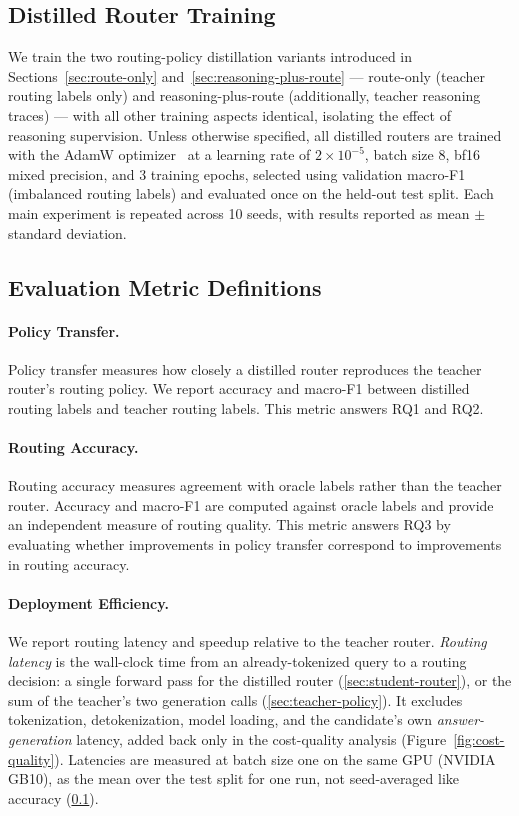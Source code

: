 \documentclass{article}
\begin{document}
\subsection{Distilled Router Training}
\label{sec:training-protocol}

We train the two routing-policy distillation variants introduced in Sections~\ref{sec:route-only} and~\ref{sec:reasoning-plus-route} — route-only (teacher routing labels only) and reasoning-plus-route (additionally, teacher reasoning traces) — with all other training aspects identical, isolating the effect of reasoning supervision. Unless otherwise specified, all distilled routers are trained with the AdamW optimizer~\citep{loshchilov2019decoupled} at a learning rate of $2 \times 10^{-5}$, batch size 8, bf16 mixed precision, and 3 training epochs, selected using validation macro-F1 (imbalanced routing labels) and evaluated once on the held-out test split. Each main experiment is repeated across 10 seeds, with results reported as mean $\pm$ standard deviation.

\subsection{Evaluation Metric Definitions}
\label{sec:eval-metrics-appendix}

\paragraph{Policy Transfer.}
\label{sec:routing-policy-transfer}
Policy transfer measures how closely a distilled router reproduces the teacher router's routing policy. We report accuracy and macro-F1 between distilled routing labels and teacher routing labels. This metric answers RQ1 and RQ2.

\paragraph{Routing Accuracy.}
\label{sec:routing-correctness}
Routing accuracy measures agreement with oracle labels rather than the teacher router. Accuracy and macro-F1 are computed against oracle labels and provide an independent measure of routing quality. This metric answers RQ3 by evaluating whether improvements in policy transfer correspond to improvements in routing accuracy.

\paragraph{Deployment Efficiency.}
\label{sec:efficiency}
We report routing latency and speedup relative to the teacher router.
\emph{Routing latency} is the wall-clock time from an already-tokenized
query to a routing decision: a single forward pass for the distilled
router (\ref{sec:student-router}), or the sum of the teacher's two
generation calls (\ref{sec:teacher-policy}). It excludes tokenization,
detokenization, model loading, and the candidate's own
\emph{answer-generation} latency, added back only in the cost-quality
analysis (Figure~\ref{fig:cost-quality}). Latencies are measured at
batch size one on the same GPU (NVIDIA GB10), as the mean over the
test split for one run, not seed-averaged like accuracy
(\ref{sec:training-protocol}).
\end{document}
